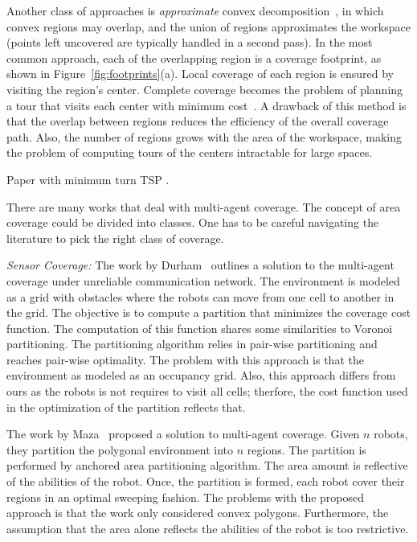 \documentclass[../main.tex]{subfiles}
\begin{document}
Another class of approaches is \emph{approximate} convex decomposition~\cite{Galceran2013surveycpp}, in which convex regions may overlap, and the union of regions approximates the workspace (points left uncovered are typically handled in a second pass). In the most common approach, each of the overlapping region is a coverage footprint, as shown in Figure~\ref{fig:footprints}(a). Local coverage of each region is ensured by visiting the region's center. Complete coverage becomes the problem of planning a tour that visits each center with minimum cost~\cite{arkin2000approximation}. A drawback of this method is that the overlap between regions reduces the efficiency of the overall coverage path. Also, the number of regions grows with the area of the workspace, making the problem of computing tours of the centers intractable for large spaces.




Paper with minimum turn TSP\cite{wagner2001approximation}
\cite{arkin2005optimal}.

There are many works that deal with multi-agent coverage. The concept of area coverage could be divided into classes. One has to be careful navigating the literature to pick the right class of coverage.

\textit{Sensor Coverage:}
The work by Durham~\cite{durham2012discrete} outlines a solution to the  multi-agent coverage under unreliable communication network. The environment is modeled as a grid with obstacles where the robots can move from one cell to another in the grid. The objective is to compute a partition that minimizes the coverage cost function. The computation of this function shares some similarities to Voronoi partitioning. The partitioning algorithm relies in pair-wise partitioning and reaches pair-wise optimality. The problem with this approach is that the environment as modeled as an occupancy grid. Also, this approach differs from ours as the robots is not requires to visit all cells; therfore, the cost function used in the optimization of the partition reflects that.

The work by Maza~\cite{maza2007multiple} proposed a solution to multi-agent coverage. Given $n$ robots, they partition the polygonal environment into $n$ regions. The partition is performed by anchored area partitioning algorithm. The area amount is reflective of the abilities of the robot. Once, the partition is formed, each robot cover their regions in an optimal sweeping fashion. The problems with the proposed approach is that the work only considered convex polygons. Furthermore, the assumption that the area alone reflects the abilities of the robot is too restrictive.
\end{document}
